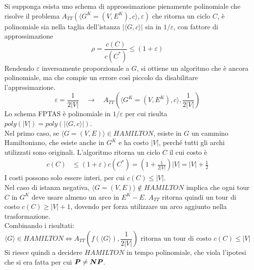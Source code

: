 Si supponga esista uno schema di approssimazione pienamente polinomiale che risolve il problema $
A_{TT} \left( 
    \langle
        G^K = (V,E^K), c
    \rangle
    , \varepsilon
\right)
$ che ritorna un ciclo $C$, è polinomiale sia nella taglia dell'istanza $|
    \langle
        G, c
    \rangle
|$ sia in $1/\varepsilon$, con fattore di approssimazione
\begin{equation*}
    \rho = 
    \frac{
        c \left( C \right)
    }{
        c \left( C^* \right)
    }
    \leq \left( 1+\varepsilon \right)
\end{equation*}
Rendendo $\varepsilon$ inversamente proporzionale a $G$, si ottiene un algoritmo che è ancora polinomiale, ma che compie un errore così piccolo da disabilitare l'apprssimazione.
\begin{equation*}
    \varepsilon = 
    \frac{1}{2|V|}
    \quad
    \to
    \quad
    A_{TT} \left( 
        \langle
            G^K = (V,E^K), c
        \rangle
        ,
        \frac{1}{2|V|}
    \right)
\end{equation*}
Lo schema FPTAS è polinomiale in $1/\varepsilon$ per cui risulta $poly(|V|) = poly (|
\langle
G,c
\rangle 
|)
$.
\\
Nel primo caso, se $ \langle G = (V,E) \rangle \in HAMILTON$, esiste in $G$ un cammino Hamiltoniano, che esiste anche in $G^K$ e ha costo $|V|$, perché tutti gli archi utilizzati sono originali.
L'algoritmo ritorna un ciclo $C$ il cui costo è
\begin{align*}
    c(C) 
    &
    \leq
    \left( 1 + \varepsilon \right)
    c(C^*)
    =
    \left( 1 +
        \frac{1}{2|V|}
    \right)
    |V|
    = |V| + \frac{1}{2}
\end{align*}
I costi possono solo essere interi, per cui 
$
c(C) \leq |V|
$.
\\
Nel caso di istanza negativa, $
\langle G = (V,E) \rangle \notin HAMILTON
$ implica che ogni tour $C$ in $G^K$ deve usare almeno un arco in $E^K-E$.
$A_{TT}$ ritorna quindi un tour di costo 
$
c(C) \geq |V| + 1
$, dovendo per forza utilizzare un arco aggiunto nella trasformazione.
\\
Combinando i risultati:
\begin{equation*}
    \langle G \rangle \in HAMILTON
    \Leftrightarrow
    A_{TT}
    \left( 
        f ( \langle G \rangle)
        ,
        \frac{1}{2|V|}
    \right)
    \text{ ritorna un tour di costo } c(C) \leq |V|
\end{equation*}
Si riesce quindi a decidere $HAMILTON$ in tempo polinomiale, che viola l'ipotesi che si era fatta per cui
$\bm{P} \neq \bm{NP}$.


